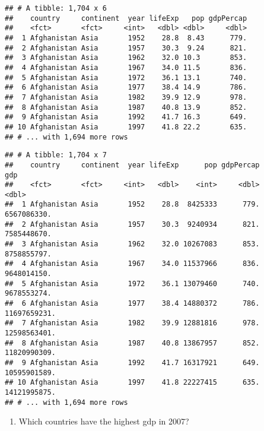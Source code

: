 \documentclass[]{article}
\newenvironment{Shaded}{\begin{snugshade}}{\end{snugshade}}
\newcommand{\KeywordTok}[1]{\textcolor[rgb]{0.13,0.29,0.53}{\textbf{#1}}}
\newcommand{\DataTypeTok}[1]{\textcolor[rgb]{0.13,0.29,0.53}{#1}}
\newcommand{\StringTok}[1]{\textcolor[rgb]{0.31,0.60,0.02}{#1}}
\newcommand{\CommentTok}[1]{\textcolor[rgb]{0.56,0.35,0.01}{\textit{#1}}}
\newcommand{\OperatorTok}[1]{\textcolor[rgb]{0.81,0.36,0.00}{\textbf{#1}}}
\newcommand{\NormalTok}[1]{#1}
\providecommand{\tightlist}{%
  \setlength{\itemsep}{0pt}\setlength{\parskip}{0pt}}
\begin{document}
\begin{verbatim}
## # A tibble: 1,704 x 6
##    country     continent  year lifeExp   pop gdpPercap
##    <fct>       <fct>     <int>   <dbl> <dbl>     <dbl>
##  1 Afghanistan Asia       1952    28.8  8.43      779.
##  2 Afghanistan Asia       1957    30.3  9.24      821.
##  3 Afghanistan Asia       1962    32.0 10.3       853.
##  4 Afghanistan Asia       1967    34.0 11.5       836.
##  5 Afghanistan Asia       1972    36.1 13.1       740.
##  6 Afghanistan Asia       1977    38.4 14.9       786.
##  7 Afghanistan Asia       1982    39.9 12.9       978.
##  8 Afghanistan Asia       1987    40.8 13.9       852.
##  9 Afghanistan Asia       1992    41.7 16.3       649.
## 10 Afghanistan Asia       1997    41.8 22.2       635.
## # ... with 1,694 more rows
\end{verbatim}

\begin{Shaded}
\end{Shaded}

\begin{verbatim}
## # A tibble: 1,704 x 7
##    country     continent  year lifeExp      pop gdpPercap          gdp
##    <fct>       <fct>     <int>   <dbl>    <int>     <dbl>        <dbl>
##  1 Afghanistan Asia       1952    28.8  8425333      779.  6567086330.
##  2 Afghanistan Asia       1957    30.3  9240934      821.  7585448670.
##  3 Afghanistan Asia       1962    32.0 10267083      853.  8758855797.
##  4 Afghanistan Asia       1967    34.0 11537966      836.  9648014150.
##  5 Afghanistan Asia       1972    36.1 13079460      740.  9678553274.
##  6 Afghanistan Asia       1977    38.4 14880372      786. 11697659231.
##  7 Afghanistan Asia       1982    39.9 12881816      978. 12598563401.
##  8 Afghanistan Asia       1987    40.8 13867957      852. 11820990309.
##  9 Afghanistan Asia       1992    41.7 16317921      649. 10595901589.
## 10 Afghanistan Asia       1997    41.8 22227415      635. 14121995875.
## # ... with 1,694 more rows
\end{verbatim}

\begin{enumerate}
\def\labelenumi{\arabic{enumi}.}
\setcounter{enumi}{5}
\tightlist
\item
  Which countries have the highest gdp in 2007?
\end{enumerate}
\end{document}
